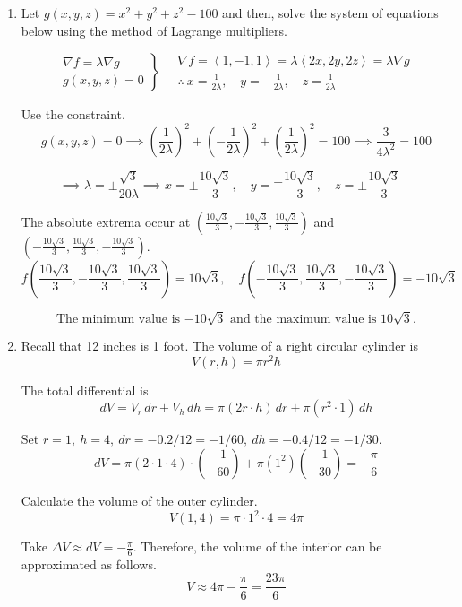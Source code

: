 \documentclass[a4paper, 12pt]{article}
\begin{document}
\begin{enumerate}[leftmargin=*,label=\textbf{\arabic*.}]
\item Let $g(x,y,z)=x^2+y^2+z^2-100$ and then, solve the system of equations below using the method of Lagrange multipliers.

\[
\left.
\begin{array}{l}
\displaystyle\nabla f=\lambda\nabla g\\
\displaystyle g(x,y,z)=0
\end{array}
\right\}\quad\begin{array}{c}
\nabla f=\left\langle1,-1,1\right\rangle=\lambda\left\langle2x,2y,2z\right\rangle=\lambda\nabla g\\[1em]\displaystyle\therefore\: x=\frac1{2\lambda},\quad y=-\frac1{2\lambda},\quad z=\frac1{2\lambda}
\end{array}
\]

Use the constraint.
\[g(x,y,z)=0\implies\left(\frac1{2\lambda}\right)^2+\left(-\frac1{2\lambda}\right)^2+\left(\frac1{2\lambda}\right)^2=100\implies\frac3{4\lambda^2}=100\]

\[\implies\lambda=\pm\frac{\sqrt3}{20\lambda}\implies x=\pm\frac{10\sqrt3}3,\quad y=\mp\frac{10\sqrt3}3,\quad z=\pm\frac{10\sqrt3}3\quad\]

The absolute extrema occur at $\left(\frac{10\sqrt3}3,-\frac{10\sqrt3}3,\frac{10\sqrt3}3\right)$ and $\left(-\frac{10\sqrt3}3,\frac{10\sqrt3}3,-\frac{10\sqrt3}3\right)$.
\[f\left(\frac{10\sqrt3}3,-\frac{10\sqrt3}3,\frac{10\sqrt3}3\right)=10\sqrt3,\quad f\left(-\frac{10\sqrt3}3,\frac{10\sqrt3}3,-\frac{10\sqrt3}3\right)=-10\sqrt3\]

\[\boxed{\text{The minimum value is }{-10\sqrt3}\text{ and the maximum value is }10\sqrt3.}\]

\item Recall that 12 inches is 1 foot. The volume of a right circular cylinder is
\[V(r,h)=\pi r^2 h\]

The total differential is
\[dV=V_r\,dr+V_h\,dh=\pi\left(2r\cdot h\right)\,dr+\pi\left(r^2\cdot 1\right)\,dh\]

Set $r=1,\:h=4,\:dr=-0.2/12=-1/60,\:dh=-0.4/12=-1/30$.
\[dV=\pi\left(2\cdot1\cdot 4\right)\cdot\left(-\frac1{60}\right)+\pi\left(1^2\right)\left(-\frac1{30}\right)=-\frac\pi6\]

Calculate the volume of the outer cylinder.
\[V(1,4)=\pi\cdot1^2\cdot4=4\pi\]

Take $\displaystyle\Delta V\approx dV=-\frac\pi6$. Therefore, the volume of the interior can be approximated as follows.
\[\boxed{V\approx4\pi-\frac\pi6=\frac{23\pi}6}\]


\end{enumerate}
\end{document}
